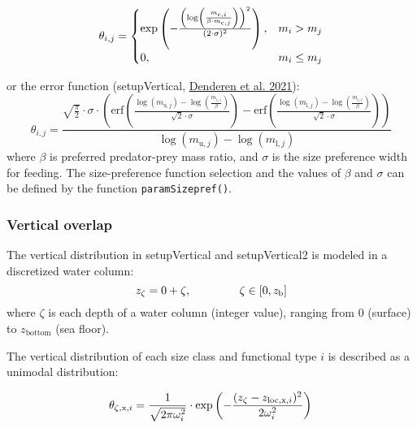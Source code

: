\documentclass[
]{article}
\begin{document}
\begin{equation}
 \theta_{i, j} =
  \begin{cases}
\exp\left( -\frac{\left(\log\left(\frac{m_{\mathrm{c},i}}{\beta \cdot m_{\mathrm{c},j}}\right)\right)^2}{(2 \cdot \sigma)^2} \right), & \text{$ m_{i} > m_{j} $}   \\
     0, & \text{$ m_{i} \leq m_{j} $} 
  \end{cases}
\label{eq:lognormalpreference}
\end{equation}

or the error function (setupVertical,
\protect\hyperlink{ref-van2021emergent}{Denderen et al. 2021}):
\begin{equation}
\theta_{i, j} = \frac{\sqrt{\frac{\pi}{2}} \cdot \sigma \cdot \left( \text{erf}\left(\frac{\log(m_{\mathrm{u},j}) - \log\left(\frac{m_{\mathrm{c},i}}{\beta}\right)}{\sqrt{2} \cdot \sigma}\right) - \text{erf}\left(\frac{\log(m_{\mathrm{l},j}) - \log\left(\frac{m_{\mathrm{c},i}}{\beta}\right)}{\sqrt{2} \cdot \sigma}\right) \right)}{\log(m_{\mathrm{u},j}) - \log(m_{\mathrm{l},j})}
\label{eq:errorpreference}
\end{equation} where \(\beta\) is preferred predator-prey mass ratio,
and \(\sigma\) is the size preference width for feeding. The
size-preference function selection and the values of \(\beta\) and
\(\sigma\) can be defined by the function \texttt{paramSizepref()}.

\hypertarget{vertical-overlap}{%
\subsubsection{Vertical overlap}\label{vertical-overlap}}

The vertical distribution in setupVertical and setupVertical2 is modeled
in a discretized water column: \begin{equation}
z_{\mathrm{\zeta}} =  0+\zeta, \hspace{1.5cm}  \zeta\in[0,z_{\mathrm{b}}]
\end{equation} where \(\zeta\) is each depth of a water column (integer
value), ranging from \(0\) (surface) to \(z_{\mathrm{bottom}}\) (sea
floor).

The vertical distribution of each size class and functional type \(i\)
is described as a unimodal distribution:

\begin{equation}
  \theta_{\mathrm{\zeta},\mathrm{x},i} = \frac{1}{\sqrt{2\pi\omega_i^2}} \cdot \exp\left(-\frac{(z_{\mathrm{\zeta}} - z_{\mathrm{loc},\mathrm{x},i})^2}{2\omega_i^2}\right)\\
  \label{eq:vertdist1}
\end{equation}
\end{document}
